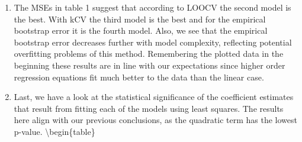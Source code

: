 \documentclass[
]{article}
\begin{document}
\begin{enumerate}
\def\labelenumi{(\alph{enumi})}
\setcounter{enumi}{3}
\item
  The MSEs in table 1 suggest that according to LOOCV the second model
  is the best. With kCV the third model is the best and for the
  empirical bootstrap error it is the fourth model. Also, we see that
  the empirical bootstrap error decreases further with model complexity,
  reflecting potential overfitting problems of this method. Remembering
  the plotted data in the beginning these results are in line with our
  expectations since higher order regression equations fit much better
  to the data than the linear case.
\item
  Last, we have a look at the statistical significance of the
  coefficient estimates that result from fitting each of the models
  using least squares. The results here align with our previous
  conclusions, as the quadratic term has the lowest p-value.
  \textbackslash begin\{table\}
\end{enumerate}
\end{document}
